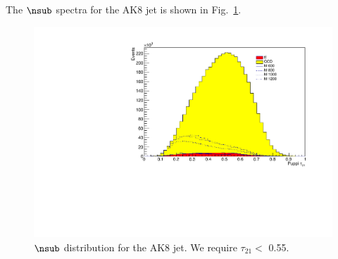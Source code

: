 The $\nsub$ spectra for the AK8 jet is shown in Fig.~\ref{fig:tau21}.

\begin{figure}[th!b]
\begin{center}
\includegraphics[scale=0.5]{F5/shapeptau21.pdf}
\end{center}
\caption{$\nsub$ distribution for the AK8 jet. We require $\tau_{21} <$ 0.55.\label{fig:tau21}}
\end{figure}



